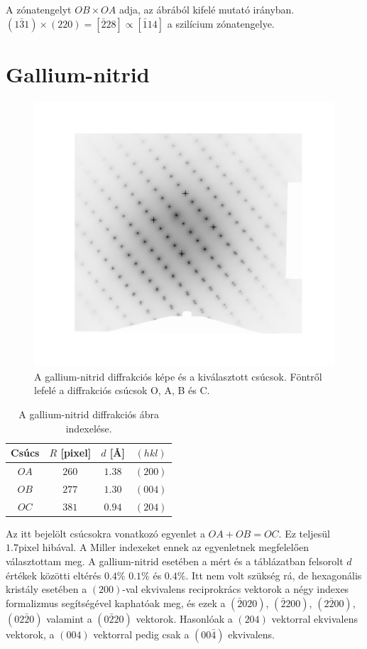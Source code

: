 \documentclass[pdftex,12pt,a4paper]{article}
\begin{document}
		A zónatengelyt $OB\times OA$ adja, az ábrából kifelé mutató irányban. $(1\bar{3}1)\times(220)=[\bar{2}28]\propto[\bar{1}14]$ a szilícium zónatengelye.
	\section{Gallium-nitrid}
		\begin{figure}[H]
			\centering
			\includegraphics[scale=0.5]{gan.pdf}
			\caption{A gallium-nitrid diffrakciós képe és a kiválasztott csúcsok. Föntről lefelé a diffrakciós csúcsok O, A, B és C.}
			\label{gan}
		\end{figure}
		\begin{table}[H]
			\centering
			\begin{tabular}{|c|c|c|c|}
				\hline
				Csúcs & $R$ [pixel] & $d$ [\AA] & $(hkl)$\\
				\hline
				$OA$ & $260$ & $1.38$ & $(200)$\\
				$OB$ & $277$ & $1.30$ & $(004)$\\
				$OC$ & $381$ & $0.94$ & $(204)$\\
				\hline
			\end{tabular}
			\caption{A gallium-nitrid diffrakciós ábra indexelése.}
		\end{table}
		Az itt bejelölt csúcsokra vonatkozó egyenlet a $OA+OB=OC$. Ez teljesül $1.7\text{pixel}$ hibával. A Miller indexeket ennek az egyenletnek megfelelően választottam meg. A gallium-nitrid esetében a mért és a táblázatban felsorolt $d$ értékek közötti eltérés $0.4\%$ $0.1\%$ és $0.4\%$. Itt nem volt szükség rá, de hexagonális kristály esetében a $(200)$-val ekvivalens reciprokrács vektorok a négy indexes formalizmus segítségével kaphatóak meg, és ezek a $(\bar{2}020)$, $(\bar{2}200)$, $(2\bar{2}00)$, $(02\bar{2}0)$ valamint a $(0\bar{2}20)$ vektorok. Hasonlóak a $(204)$ vektorral ekvivalens vektorok, a $(004)$ vektorral pedig csak a $(00\bar{4})$ ekvivalens.
		
\end{document}
